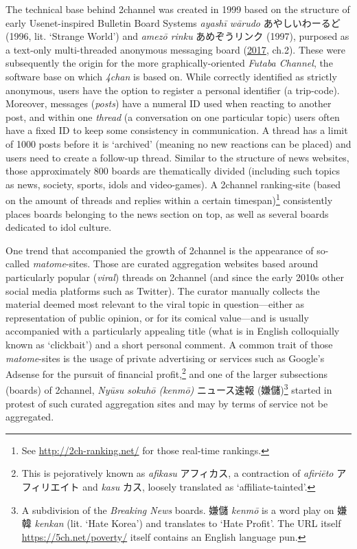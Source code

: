\documentclass[10pt,british,A4paper,oneside]{memoir}
\begin{document}
The technical base behind 2channel was created in 1999 based on the
structure of early Usenet-inspired Bulletin Board Systems \emph{ayashī
wārudo} あやしいわーるど (1996, lit. `Strange World') and \emph{amezō
rinku} あめぞうリンク (1997), purposed as a text-only multi-threaded
anonymous messaging board
(\protect\hyperlink{ref-barubora_eng:_2017}{2017}, ch.2). These were
subsequently the origin for the more graphically-oriented \emph{Futaba
Channel}, the software base on which \emph{4chan} is based on. While
correctly identified as strictly anonymous, users have the option to
register a personal identifier (a trip-code). Moreover, messages
(\emph{posts}) have a numeral ID used when reacting to another post, and
within one \emph{thread} (a conversation on one particular topic) users
often have a fixed ID to keep some consistency in communication. A
thread has a limit of 1000 posts before it is `archived' (meaning no new
reactions can be placed) and users need to create a follow-up thread.
Similar to the structure of news websites, those approximately 800
boards are thematically divided (including such topics as news, society,
sports, idols and video-games). A 2channel ranking-site (based on the
amount of threads and replies within a certain timespan)\footnote{See
  \url{http://2ch-ranking.net/} for those real-time rankings.}
consistently places boards belonging to the news section on top, as well
as several boards dedicated to idol culture.

One trend that accompanied the growth of 2channel is the appearance of
so-called \emph{matome}-sites. Those are curated aggregation websites
based around particularly popular (\emph{viral}) threads on 2channel
(and since the early 2010s other social media platforms such as
Twitter). The curator manually collects the material deemed most
relevant to the viral topic in question---either as representation of
public opinion, or for its comical value---and is usually accompanied
with a particularly appealing title (what is in English colloquially
known as `clickbait') and a short personal comment. A common trait of
those \emph{matome}-sites is the usage of private advertising or
services such as Google's Adsense for the pursuit of financial
profit,\footnote{This is pejoratively known as \emph{afikasu}
  アフィカス, a contraction of \emph{afiriēto} アフィリエイト and
  \emph{kasu} カス, loosely translated as `affiliate-tainted'.} and one
of the larger subsections (boards) of 2channel, \emph{Nyūsu sokuhō
(kenmō)} ニュース速報 (嫌儲)\footnote{A subdivision of the
  \emph{Breaking News} boards. 嫌儲 \emph{kenmō} is a word play on 嫌韓
  \emph{kenkan} (lit. `Hate Korea') and translates to `Hate Profit'. The
  URL itself \url{https://5ch.net/poverty/} itself contains an English
  language pun.} started in protest of such curated aggregation sites
and may by terms of service not be aggregated.
\end{document}
